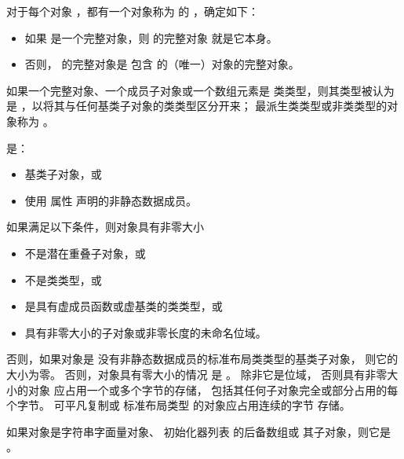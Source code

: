 \pnum
对于每个对象 ，都有一个对象称为  的 ，确定如下：
\begin{itemize}
\item
如果  是一个完整对象，则  的完整对象
就是它本身。

\item
否则， 的完整对象是
包含  的（唯一）对象的完整对象。
\end{itemize}

\pnum
如果一个完整对象、一个成员子对象或一个数组元素是
类类型，则其类型被认为是 ，以将其与任何基类子对象的类类型区分开来；
最派生类类型或非类类型的对象称为
。

\pnum
{} 是：
\begin{itemize}
\item 基类子对象，或
\item 使用  属性 声明的非静态数据成员。
\end{itemize}

\pnum
{}%
%
如果满足以下条件，则对象具有非零大小
\begin{itemize}
\item 不是潜在重叠子对象，或
\item 不是类类型，或
\item 是具有虚成员函数或虚基类的类类型，或
\item 具有非零大小的子对象或非零长度的未命名位域。
\end{itemize}
否则，如果对象是
没有非静态数据成员的标准布局类类型的基类子对象，
则它的大小为零。
否则，对象具有零大小的情况
是 。
%
除非它是位域，
否则具有非零大小的对象
应占用一个或多个字节的存储，
包括其任何子对象完全或部分占用的每个字节。
可平凡复制或
标准布局类型 的对象应占用连续的字节
存储。

\pnum
如果对象是字符串字面量对象、
初始化器列表 的后备数组或
其子对象，则它是 。

